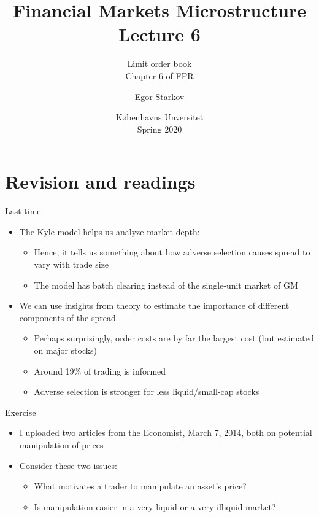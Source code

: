 \documentclass[english,10pt]{beamer}
\title{Financial Markets Microstructure \\ Lecture 6}
\subtitle{Limit order book\\
	Chapter 6 of FPR}
\author{Egor Starkov}
\date{K{\o}benhavns Unversitet \\
	Spring 2020}
\begin{document}
\frame[plain]{\titlepage}

\section{Revision and readings}

\begin{frame}{Last time}
	\begin{itemize}
		\item The Kyle model helps us analyze market depth:
		\begin{itemize}
			\item Hence, it tells us something about how adverse selection causes spread to vary with trade size
			\item The model has batch clearing instead of the single-unit market of GM
		\end{itemize}
		\item We can use insights from theory to estimate the importance of different components of the spread
		\begin{itemize}
			\item Perhaps surprisingly, order costs are by far the largest cost (but estimated on major stocks)
			\item Around 19\% of trading is informed
			\item Adverse selection is stronger for less liquid/small-cap stocks
		\end{itemize}
	\end{itemize}
\end{frame}


\begin{frame}{Exercise}
	\begin{itemize}
		\item I uploaded two articles from the Economist, March 7, 2014, both on potential manipulation of prices
		\item Consider these two issues:
		\begin{itemize}
			\item What motivates a trader to manipulate an asset's price? 
			\item Is manipulation easier in a very liquid or a very illiquid market?
		\end{itemize}
	\end{itemize}
\end{frame}
\end{document}
